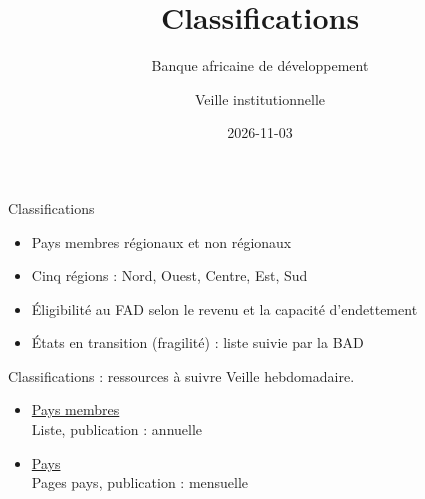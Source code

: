 \documentclass[aspectratio=169,11pt]{beamer}
\title{Classifications}
\subtitle{Banque africaine de développement}
\author{Veille institutionnelle}
\date{2026-11-03}
\begin{document}
\begin{frame}\titlepage\end{frame}

\begin{frame}{Classifications}
\begin{itemize}
\item Pays membres régionaux et non régionaux
\item Cinq régions : Nord, Ouest, Centre, Est, Sud
\item Éligibilité au FAD selon le revenu et la capacité d'endettement
\item États en transition (fragilité) : liste suivie par la BAD
\end{itemize}
\end{frame}

\begin{frame}{Classifications : ressources à suivre}
\small
Veille hebdomadaire.
\begin{itemize}
\item \href{https://www.afdb.org/en/about-us/corporate-information/members}{Pays membres}\\{\footnotesize Liste, publication : annuelle}
\item \href{https://www.afdb.org/en/countries}{Pays}\\{\footnotesize Pages pays, publication : mensuelle}
\end{itemize}
\end{frame}
\end{document}
